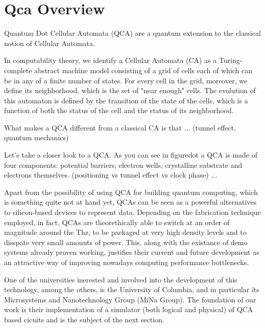 \section{Qca Overview}\label{sec:i}
Quantum Dot Cellular Automata (QCA) are a quantum extension to the classical notion of Cellular Automata. 

In computability theory, we identify a Cellular Automata (CA) as a Turing-complete abstract machine model consisting of a grid of cells each of which can be in any of a finite number of states. For every cell in the grid, moreover, we define its neighborhood, which is the set of "near enough" cells. The evolution of this automaton is defined by the transition of the state of the cells, which is a function of both the status of the cell and the status of its neighborhood.

What makes a QCA different from a classical CA is that ... (tunnel effect, quantum mechanics)

Let's take a closer look to a QCA. As you can see in figure{dot} a QCA is made of four components: potential barriers, electron wells, crystalline substrate and electrons themselves. (positioning vs tunnel effect vs clock phase) ...

Apart from the possibility of using QCA for building quantum computing, which is something quite not at hand yet, QCAs can be seen as a powerful alternatives to silicon-based devices to represent data. Depending on the fabrication technique employed, in fact, QCAs are theorethically able to switch at an order of magnitude around the Thz, to be packaged at very high density levels and to disspate very small amounts of power. This, along with the existance of demo systems already proven working, justifies their current and future development as an attractive way of improving nowadays computing performance bottlenecks.

One of the universities inerested and involved into the development of this technology, among the others, is the University of Columbia, and in particular its Microsystems and Nanotechnology Group (MiNa Group). The foundation of our work is their implementation of a simulator (both logical and physical) of QCA based cicuits and is the subject of the next section.

